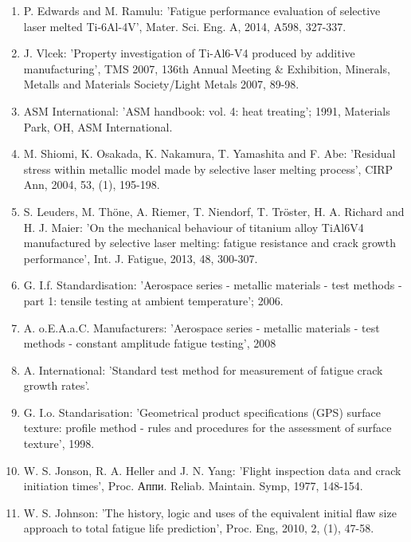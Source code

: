 \documentclass[10pt]{article}
\begin{document}
\begin{enumerate}
  \item P. Edwards and M. Ramulu: 'Fatigue performance evaluation of selective laser melted Ti-6Al-4V', Mater. Sci. Eng. A, 2014, A598, 327-337.

  \item J. Vlcek: 'Property investigation of Ti-Al6-V4 produced by additive manufacturing', TMS 2007, 136th Annual Meeting \& Exhibition, Minerals, Metalls and Materials Society/Light Metals 2007, 89-98.

  \item ASM International: 'ASM handbook: vol. 4: heat treating'; 1991, Materials Park, OH, ASM International.

  \item M. Shiomi, K. Osakada, K. Nakamura, T. Yamashita and F. Abe: 'Residual stress within metallic model made by selective laser melting process', CIRP Ann, 2004, 53, (1), 195-198.

  \item S. Leuders, M. Thöne, A. Riemer, T. Niendorf, T. Tröster, H. A. Richard and H. J. Maier: 'On the mechanical behaviour of titanium alloy TiAl6V4 manufactured by selective laser melting: fatigue resistance and crack growth performance', Int. J. Fatigue, 2013, 48, 300-307.

  \item G. I.f. Standardisation: 'Aerospace series - metallic materials - test methods - part 1: tensile testing at ambient temperature'; 2006.

  \item A. o.E.A.a.C. Manufacturers: 'Aerospace series - metallic materials - test methods - constant amplitude fatigue testing', 2008

  \item A. International: 'Standard test method for measurement of fatigue crack growth rates'.

  \item G. I.o. Standarisation: 'Geometrical product specifications (GPS) surface texture: profile method - rules and procedures for the assessment of surface texture', 1998.

  \item W. S. Jonson, R. A. Heller and J. N. Yang: 'Flight inspection data and crack initiation times', Proc. Аппи. Reliab. Maintain. Symp, 1977, 148-154.

  \item W. S. Johnson: 'The history, logic and uses of the equivalent initial flaw size approach to total fatigue life prediction', Proc. Eng, 2010, 2, (1), 47-58.


\end{enumerate}
\end{document}

